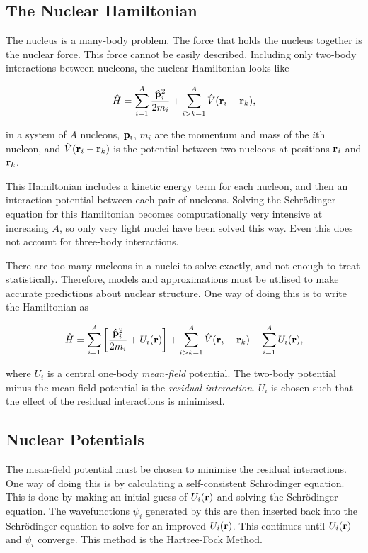 \subsection{The Nuclear Hamiltonian}

The nucleus is a many-body problem. The force that holds the nucleus together is the nuclear force. This force cannot be easily described. Including only two-body interactions between nucleons, the nuclear Hamiltonian looks like

\begin{equation}
\hat{H} = \sum_{i=1}^{A} \frac{{\bf \hat{p}}_i^2}{2m_i} + \sum_{i>k=1}^{A} \hat{V}({\bf r}_i-{\bf r}_k)\mathrm{,}
\end{equation}

in a system of $A$ nucleons, ${\bf p}_i$, $m_i$ are the momentum and mass of the $i$th nucleon, and  $\hat{V}({\bf r}_i-{\bf r}_k)$ is the potential between two nucleons at positions ${\bf r}_i$ and ${\bf r}_k$.

This Hamiltonian includes a kinetic energy term for each nucleon, and then an interaction potential between each pair of nucleons. Solving the Schr{\"o}dinger equation for this Hamiltonian becomes computationally very intensive at increasing $A$, so only very light nuclei have been solved this way\cite{latticeqcd}. Even this does not account for three-body interactions.

There are too many nucleons in a nuclei to solve exactly, and not enough to treat statistically. Therefore, models and approximations must be utilised to make accurate predictions about nuclear structure. One way of doing this is to write the Hamiltonian as

\begin{equation}
\hat{H} =  \sum_{i=1}^{A} \bigg [ \frac{{\bf \hat{p}}_i^2}{2m_i} + U_i({\bf r}) \bigg ] + \sum_{i>k=1}^{A} \hat{V}({\bf r}_i-{\bf r}_k) -  \sum_{i=1}^{A}  U_i({\bf r}) \mathrm{,}
\end{equation}

where $U_i$ is a central one-body \textit{mean-field} potential. The two-body potential minus the mean-field potential is the \textit{residual interaction}. $U_i$ is chosen such that the effect of the residual interactions is minimised.


\subsection{Nuclear Potentials} 

The mean-field potential must be chosen to minimise the residual interactions. One way of doing this is by calculating a self-consistent Schr\"odinger equation. This is done by making an initial guess of $U_i({\bf r})$ and   solving the Schr\"odinger equation. The wavefunctions $\psi_i$ generated by this are then inserted back into the Schr\"odinger equation to solve for an improved $U_i({\bf r})$. This continues until $U_i({\bf r})$ and $\psi_i$ converge. This method is the Hartree-Fock Method\cite{hartreefock}.

